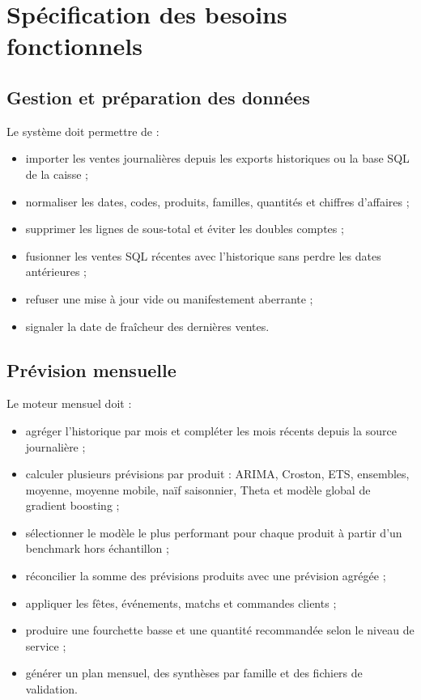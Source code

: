 \section{Spécification des besoins fonctionnels}

\subsection{Gestion et préparation des données}

Le système doit permettre de :

\begin{itemize}
  \item importer les ventes journalières depuis les exports historiques ou la
  base SQL de la caisse ;
  \item normaliser les dates, codes, produits, familles, quantités et chiffres
  d'affaires ;
  \item supprimer les lignes de sous-total et éviter les doubles comptes ;
  \item fusionner les ventes SQL récentes avec l'historique sans perdre les dates
  antérieures ;
  \item refuser une mise à jour vide ou manifestement aberrante ;
  \item signaler la date de fraîcheur des dernières ventes.
\end{itemize}

\subsection{Prévision mensuelle}

Le moteur mensuel doit :

\begin{itemize}
  \item agréger l'historique par mois et compléter les mois récents depuis la
  source journalière ;
  \item calculer plusieurs prévisions par produit : ARIMA, Croston, ETS,
  ensembles, moyenne, moyenne mobile, naïf saisonnier, Theta et modèle global de
  gradient boosting ;
  \item sélectionner le modèle le plus performant pour chaque produit à partir
  d'un benchmark hors échantillon ;
  \item réconcilier la somme des prévisions produits avec une prévision agrégée ;
  \item appliquer les fêtes, événements, matchs et commandes clients ;
  \item produire une fourchette basse et une quantité recommandée selon le niveau
  de service ;
  \item générer un plan mensuel, des synthèses par famille et des fichiers de
  validation.
\end{itemize}

